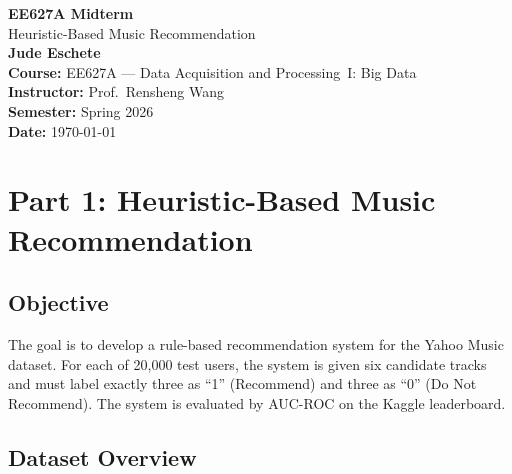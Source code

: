 \documentclass[12pt]{article}
\begin{document}
\begin{titlepage}
	\centering
	\vspace*{2cm}

	{\Huge \textbf{EE627A Midterm}}\\[0.5cm]
	{\LARGE Heuristic-Based Music Recommendation}\\[2.5cm]

	{\Large \textbf{Jude Eschete}}\\[1cm]

	{\large
		\textbf{Course:} EE627A --- Data Acquisition and Processing~I: Big Data\\[0.3cm]
		\textbf{Instructor:} Prof.\ Rensheng Wang\\[0.3cm]
		\textbf{Semester:} Spring 2026\\[0.3cm]
		\textbf{Date:} \today
	}

	\vfill
\end{titlepage}

\newpage
\tableofcontents
\newpage
\listoffigures
\newpage
\listoftables
\newpage
\listofmyequations

\newpage
{}
\section{Part 1: Heuristic-Based Music Recommendation}

\subsection{Objective}

The goal is to develop a rule-based recommendation system for the Yahoo Music dataset. For each of 20,000 test users, the system is given six candidate tracks and must label exactly three as ``1'' (Recommend) and three as ``0'' (Do Not Recommend). The system is evaluated by AUC-ROC on the Kaggle leaderboard.

\subsection{Dataset Overview}
\end{document}
